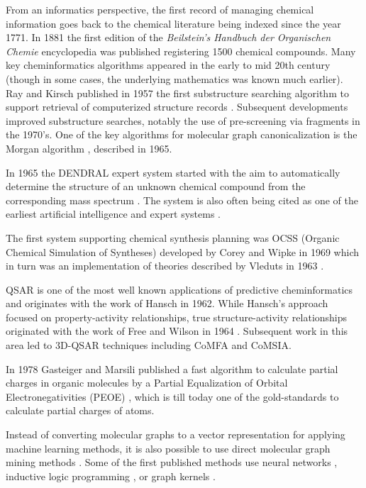 \documentclass{sig-alternate}
\begin{document}
From an informatics perspective, the first record of managing chemical
information goes back to the chemical literature being indexed since
the year 1771.  In 1881 the first edition of the \textit{Beilstein's
  Handbuch der Organischen Chemie} encyclopedia was published
\cite{polanski2009} registering 1500 chemical compounds.  Many key
cheminformatics algorithms appeared in the early to mid 20th century
(though in some cases, the underlying mathematics was known much
earlier). Ray and Kirsch published in 1957 the first substructure
searching algorithm to support retrieval of computerized structure
records \cite{RayKirsch1957}. Subsequent developments improved
substructure searches, notably the use of pre-screening via fragments
\cite{Adamson:1973fk,Feldman:1975uq} in the 1970's. One of the key
algorithms for molecular graph canonicalization is the Morgan
algorithm \cite{Morgan1965}, described in 1965.

In 1965 the DENDRAL expert system started with the aim to
automatically determine the structure of an unknown chemical compound
from the corresponding mass spectrum \cite{Gray1986}. The system is
also often being cited as one of the earliest artificial intelligence
and expert systems \cite{Chen2006}.

The first system supporting chemical synthesis planning was OCSS
(Organic Chemical Simulation of Syntheses) developed by Corey and
Wipke in 1969 \cite{CoreyWipke1969} which in turn was an
implementation of theories described by Vleduts in 1963
\cite{Vleduts:1963kx}.

QSAR is one of the most well known applications of predictive
cheminformatics and originates with the work of Hansch
\cite{Hansch:1962vn} in 1962. While Hansch's approach focused on
property-activity relationships, true structure-activity relationships
originated with the work of Free and Wilson in 1964
\cite{Free:1964ys}. Subsequent work in this area led to 3D-QSAR
techniques including CoMFA \cite{Cramer:1988zr} and
CoMSIA\cite{Klebe:1994ly}.

In 1978 Gasteiger and Marsili published a fast algorithm to calculate
partial charges in organic molecules by a Partial Equalization of
Orbital Electronegativities (PEOE) \cite{gm78}, which is till today
one of the gold-standards to calculate partial charges of atoms.

Instead of converting molecular graphs to a vector representation for
applying machine learning methods, it is also possible to use direct
molecular graph mining methods \cite{okada2006}. Some of the first
published methods use neural networks \cite{kireev1995}, inductive
logic programming \cite{yh02a}, or graph kernels \cite{kti03}.

 
\end{document}
